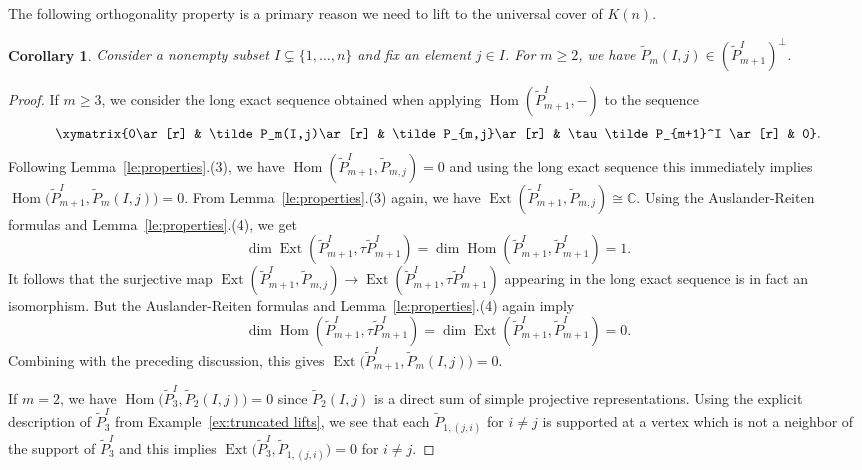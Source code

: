\documentclass{amsart}
\newtheorem{corollary}[theorem]{Corollary}
\numberwithin{equation}{section}
\newcommand{\CC}{\mathbb{C}}
\newcommand{\Ext}{\operatorname{Ext}}
\newcommand{\Hom}{\operatorname{Hom}}
\newcommand{\ses}[3]{\xymatrix{0\ar[r] & #1\ar[r] & #2\ar[r] & #3 \ar[r] & 0}}
\begin{document}
The following orthogonality property is a primary reason we need to lift to the universal cover of $K(n)$.
\begin{corollary}
  \label{cor:perpendicular}
  Consider a nonempty subset $I\subsetneq\{1,\ldots,n\}$ and fix an element $j\in I$.
  For $m\geq 2$, we have $\tilde P_m(I,j)\in (\tilde P_{m+1}^I)^\perp$.
\end{corollary}
\begin{proof}
  If $m\geq 3$, we consider the long exact sequence obtained when applying $\Hom(\tilde P_{m+1}^I,-)$ to the sequence
  \[\ses{\tilde P_m(I,j)}{\tilde P_{m,j}}{\tau\tilde P_{m+1}^I}.\]
  Following Lemma~\ref{le:properties}.(3), we have $\Hom(\tilde P_{m+1}^I,\tilde P_{m,j})=0$ and using the long exact sequence this immediately implies $\Hom\big(\tilde P_{m+1}^I,\tilde P_m(I,j)\big)=0$.
  From Lemma~\ref{le:properties}.(3) again, we have $\Ext(\tilde P_{m+1}^I,\tilde P_{m,j})\cong\CC$.
  Using the Auslander-Reiten formulas \cite[Theorem IV.2.13]{ass} and Lemma~\ref{le:properties}.(4), we get
  \[\dim\Ext(\tilde P_{m+1}^I,\tau\tilde P_{m+1}^I)=\dim\Hom(\tilde P_{m+1}^I,\tilde P_{m+1}^I)=1.\]
  It follows that the surjective map $\Ext(\tilde P_{m+1}^I,\tilde P_{m,j})\to\Ext(\tilde P_{m+1}^I,\tau\tilde P_{m+1}^I)$ appearing in the long exact sequence is in fact an isomorphism.
  But the Auslander-Reiten formulas and Lemma~\ref{le:properties}.(4) again imply 
  \[\dim\Hom(\tilde P_{m+1}^I,\tau\tilde P_{m+1}^I)=\dim\Ext(\tilde P_{m+1}^I,\tilde P_{m+1}^I)=0.\]
  Combining with the preceding discussion, this gives $\Ext\!\big(\tilde P_{m+1}^I,\tilde P_m(I,j)\big)=0$.
  
  If $m=2$, we have $\Hom\!\big(\tilde P_3^I,\tilde P_2(I,j)\big)=0$ since $\tilde P_2(I,j)$ is a direct sum of simple projective representations.
  Using the explicit description of $\tilde P_3^I$ from Example~\ref{ex:truncated lifts}, we see that each $\tilde P_{1,(j,i)}$ for $i\ne j$ is supported at a vertex which is not a neighbor of the support of $\tilde P_3^I$ and this implies $\Ext\!\big(\tilde P_3^I,\tilde P_{1,(j,i)}\big)=0$ for $i\neq j$.
\end{proof}
\end{document}
